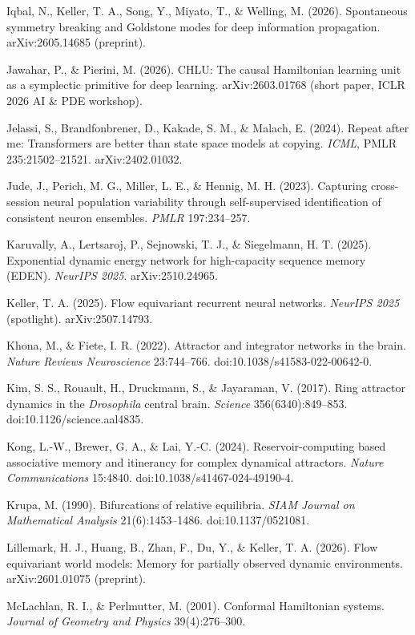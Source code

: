 \documentclass{article}
\begin{document}
{Iqbal, N., Keller, T. A., Song, Y., Miyato, T., \& Welling, M. (2026). Spontaneous symmetry breaking and Goldstone modes for deep information propagation. arXiv:2605.14685 (preprint).\par
Jawahar, P., \& Pierini, M. (2026). CHLU: The causal Hamiltonian learning unit as a symplectic primitive for deep learning. arXiv:2603.01768 (short paper, ICLR 2026 AI \& PDE workshop).\par
Jelassi, S., Brandfonbrener, D., Kakade, S. M., \& Malach, E. (2024). Repeat after me: Transformers are better than state space models at copying. \emph{ICML}, PMLR 235:21502--21521. arXiv:2402.01032.\par
Jude, J., Perich, M. G., Miller, L. E., \& Hennig, M. H. (2023). Capturing cross-session neural population variability through self-supervised identification of consistent neuron ensembles. \emph{PMLR} 197:234--257.\par
Karuvally, A., Lertsaroj, P., Sejnowski, T. J., \& Siegelmann, H. T. (2025). Exponential dynamic energy network for high-capacity sequence memory (EDEN). \emph{NeurIPS 2025}. arXiv:2510.24965.\par
Keller, T. A. (2025). Flow equivariant recurrent neural networks. \emph{NeurIPS 2025} (spotlight). arXiv:2507.14793.\par
Khona, M., \& Fiete, I. R. (2022). Attractor and integrator networks in the brain. \emph{Nature Reviews Neuroscience} 23:744--766. doi:10.1038/s41583-022-00642-0.\par
Kim, S. S., Rouault, H., Druckmann, S., \& Jayaraman, V. (2017). Ring attractor dynamics in the \emph{Drosophila} central brain. \emph{Science} 356(6340):849--853. doi:10.1126/science.aal4835.\par
Kong, L.-W., Brewer, G. A., \& Lai, Y.-C. (2024). Reservoir-computing based associative memory and itinerancy for complex dynamical attractors. \emph{Nature Communications} 15:4840. doi:10.1038/s41467-024-49190-4.\par
Krupa, M. (1990). Bifurcations of relative equilibria. \emph{SIAM Journal on Mathematical Analysis} 21(6):1453--1486. doi:10.1137/0521081.\par
Lillemark, H. J., Huang, B., Zhan, F., Du, Y., \& Keller, T. A. (2026). Flow equivariant world models: Memory for partially observed dynamic environments. arXiv:2601.01075 (preprint).\par
McLachlan, R. I., \& Perlmutter, M. (2001). Conformal Hamiltonian systems. \emph{Journal of Geometry and Physics} 39(4):276--300.\par
}
\end{document}
